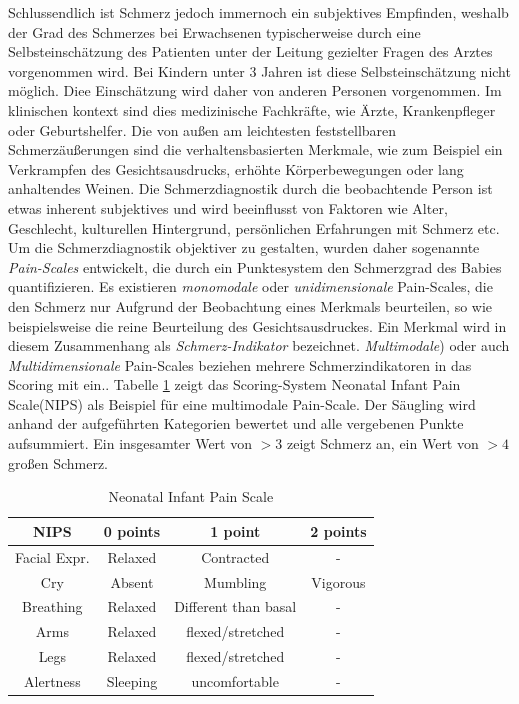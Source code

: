 Schlussendlich ist Schmerz jedoch immernoch ein subjektives Empfinden, weshalb der Grad des Schmerzes bei Erwachsenen typischerweise durch eine Selbsteinschätzung des Patienten unter der Leitung gezielter Fragen des Arztes vorgenommen wird. Bei Kindern unter 3 Jahren ist diese Selbsteinschätzung nicht möglich. Diee Einschätzung wird daher von anderen Personen vorgenommen. Im klinischen kontext sind dies medizinische Fachkräfte, wie Ärzte, Krankenpfleger oder Geburtshelfer. Die von außen am leichtesten feststellbaren Schmerzäußerungen sind die verhaltensbasierten Merkmale, wie zum Beispiel ein Verkrampfen des Gesichtsausdrucks, erhöhte Körperbewegungen oder lang anhaltendes Weinen.\cite[S. 438]{PainAssessment01} Die Schmerzdiagnostik durch die beobachtende Person ist etwas inherent subjektives und wird beeinflusst von Faktoren wie Alter, Geschlecht, kulturellen Hintergrund, persönlichen Erfahrungen mit Schmerz etc.\cite[S. 3]{overview} Um die Schmerzdiagnostik objektiver zu gestalten, wurden daher sogenannte \emph{Pain-Scales} entwickelt, die durch ein Punktesystem den Schmerzgrad des Babies quantifizieren.\cite[S. 438 - 439]{PainAssessment01} Es existieren \emph{monomodale} oder \emph{unidimensionale} Pain-Scales, die den Schmerz nur Aufgrund der Beobachtung eines Merkmals beurteilen, so wie beispielsweise die reine Beurteilung des Gesichtsausdruckes. Ein Merkmal wird in diesem Zusammenhang als \emph{Schmerz-Indikator} bezeichnet. \emph{ Multimodale}) oder auch \emph{Multidimensionale} Pain-Scales beziehen mehrere Schmerzindikatoren in das Scoring mit ein.\cite[S. 69 - 71]{PainAssessment02}. Tabelle \ref{tab:nips} zeigt das Scoring-System \glqq Neonatal Infant Pain Scale\grqq{}(NIPS) als Beispiel für eine multimodale Pain-Scale. Der Säugling wird anhand der aufgeführten Kategorien bewertet und alle vergebenen Punkte aufsummiert. Ein insgesamter Wert von $>3$ zeigt Schmerz an, ein Wert von $>4$ großen Schmerz.\cite{nips}

\begin{table}[h]
	\footnotesize
	\centering
	\caption{Neonatal Infant Pain Scale \cite{nips}}
	\label{tab:nips}
	\begin{tabular}{@{}cccc@{}}
		\toprule
		\textbf{NIPS}     & \textbf{0 points} & \textbf{1 point}     & \textbf{2 points} \\ \midrule
		Facial Expr. & Relaxed           & Contracted           & -                 \\
		Cry               & Absent            & Mumbling             & Vigorous          \\
		Breathing         & Relaxed           & Different than basal & -                 \\
		Arms              & Relaxed           & flexed/stretched     & -                 \\
		Legs              & Relaxed           & flexed/stretched     & -                 \\
		Alertness         & Sleeping          & uncomfortable        & -                 \\ \bottomrule
	\end{tabular}
\end{table}



